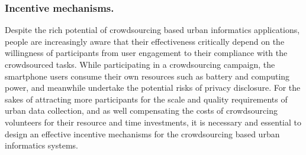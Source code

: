 \subsubsection{\textbf{Incentive mechanisms.}} Despite the rich potential of crowdsourcing based urban informatics applications, people are increasingly aware that their effectiveness critically depend on the willingness of participants from user engagement to their compliance with the crowdsourced tasks. While participating in a crowdsourcing campaign, the smartphone users consume their own resources such as battery and computing power, and meanwhile undertake the potential risks of privacy disclosure. For the sakes of attracting more participants for the scale and quality requirements of urban data collection, and as well compensating the costs of crowdsourcing volunteers for their resource and time investments, it is necessary and essential to design an effective incentive mechanisms for the crowdsourcing based urban informatics systems.

